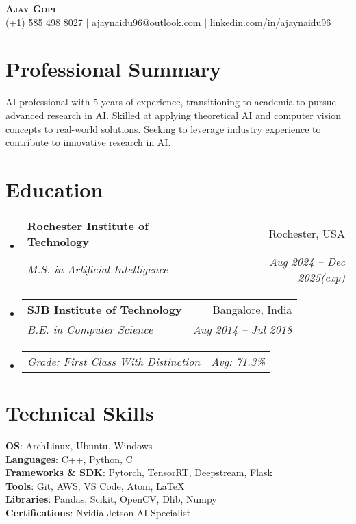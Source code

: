 \documentclass[letterpaper,9pt]{article}
\makeatletter
\newcommand{\resumeSubheading}[4]{
  \vspace{-2pt}\item
    \begin{tabular*}{0.97\textwidth}[t]{l@{\extracolsep{\fill}}r}
      \textbf{#1} & #2 \\
      \textit{\small#3} & \textit{\small #4} \\
    \end{tabular*}\vspace{-7pt}
}
\newcommand{\resumeSubSubheading}[2]{
    \item
    \begin{tabular*}{0.97\textwidth}{l@{\extracolsep{\fill}}r}
      \textit{\small#1} & \textit{\small #2} \\
    \end{tabular*}\vspace{-7pt}
}
\newcommand{\resumeSubHeadingListStart}{\begin{itemize}[leftmargin=0.15in, label={}]}
\newcommand{\resumeSubHeadingListEnd}{\end{itemize}}
\makeatother
\begin{document}
\begin{center}
    \textbf{\Huge \scshape Ajay Gopi} \\ \vspace{1pt}
    \small (+1) 585 498 8027 $|$ \href{mailto:ajaynaidu96@outlook.com}{\underline{ajaynaidu96@outlook.com}} $|$
    \href{https://www.linkedin.com/in/ajaynaidu96/}{\underline{linkedin.com/in/ajaynaidu96}}
\end{center}

\section{Professional Summary}
AI professional with 5 years of experience, transitioning to academia to pursue advanced research in AI. Skilled at applying theoretical AI and computer vision concepts to real-world solutions. Seeking to leverage industry experience to contribute to innovative research in AI.

\section{Education}
\resumeSubHeadingListStart
  \resumeSubheading
    {Rochester Institute of Technology}{Rochester, USA}
    {M.S. in Artificial Intelligence}{Aug 2024 -- Dec 2025(exp)}
  \resumeSubheading
    {SJB Institute of Technology}{Bangalore, India}
    {B.E. in Computer Science}{Aug 2014 -- Jul 2018}
    \resumeSubSubheading
      {Grade: First Class With Distinction}{Avg: 71.3\%}
\resumeSubHeadingListEnd

\section{Technical Skills}
\begin{itemize}[leftmargin=0.15in, label={}]
    \small{\item{
    \textbf{OS}{: ArchLinux, Ubuntu, Windows} \\
    \textbf{Languages}{: C++, Python, C} \\
    \textbf{Frameworks \& SDK}{: Pytorch, TensorRT, Deepstream, Flask} \\
    \textbf{Tools}{: Git, AWS, VS Code, Atom, LaTeX} \\
    \textbf{Libraries}{: Pandas, Scikit, OpenCV, Dlib, Numpy} \\
    \textbf{Certifications}{: Nvidia Jetson AI Specialist}
    }}
\end{itemize}
\end{document}
